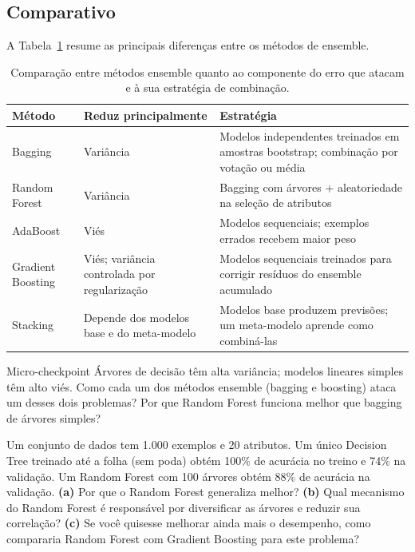 \documentclass[12pt,a4paper]{article}
\begin{document}
\subsection{Comparativo}

A Tabela~\ref{tab:ensembles} resume as principais diferenças entre os métodos de ensemble.

\begin{table}[htb]
\centering
\caption{Comparação entre métodos ensemble quanto ao componente do erro que atacam e à sua estratégia de combinação.}
\label{tab:ensembles}
\renewcommand{\arraystretch}{1.3}
\begin{tabular}{p{2.8cm}p{4.5cm}p{}}
\toprule
\textbf{Método} & \textbf{Reduz principalmente} & \textbf{Estratégia} \\
\midrule
Bagging & Variância & Modelos independentes treinados em amostras bootstrap; combinação por votação ou média \\
Random Forest & Variância & Bagging com árvores + aleatoriedade na seleção de atributos \\
AdaBoost & Viés & Modelos sequenciais; exemplos errados recebem maior peso \\
Gradient Boosting & Viés; variância controlada por regularização & Modelos sequenciais treinados para corrigir resíduos do ensemble acumulado \\
Stacking & Depende dos modelos base e do meta-modelo & Modelos base produzem previsões; um meta-modelo aprende como combiná-las \\
\bottomrule
\end{tabular}
\end{table}

\begin{checkpointbox}{Micro-checkpoint}
Árvores de decisão têm alta variância; modelos lineares simples têm alto viés. Como cada um dos métodos ensemble (bagging e boosting) ataca um desses dois problemas? Por que Random Forest funciona melhor que bagging de árvores simples?
\end{checkpointbox}

\begin{perguntabox}
Um conjunto de dados tem 1.000 exemplos e 20 atributos. Um único Decision Tree treinado até a folha (sem poda) obtém 100\% de acurácia no treino e 74\% na validação. Um Random Forest com 100 árvores obtém 88\% de acurácia na validação. \textbf{(a)} Por que o Random Forest generaliza melhor? \textbf{(b)} Qual mecanismo do Random Forest é responsável por diversificar as árvores e reduzir sua correlação? \textbf{(c)} Se você quisesse melhorar ainda mais o desempenho, como compararia Random Forest com Gradient Boosting para este problema?
\end{perguntabox}
\end{document}
